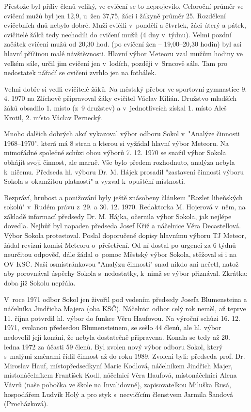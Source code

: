 \documentclass[a5paper, 12pt, twoside]{article}
\begin{document}
Přestože byl příliv členů veliký, ve cvičení se to neprojevilo.
Celoroční průměr ve cvičení mužů byl jen 12,9, u~žen 37,75, žáci i
žákyně průměr 25. Rozdělení cvičebních dnů nebylo dobré. Muži cvičili
v~pondělí a čtvrtek, žáci úterý a pátek, cvičitelé žáků tedy nechodili do
cvičení mužů (4 dny v~týdnu). Velmi pozdní začátek cvičení mužů od 20,30
hod. (po cvičení žen --⁠⁠⁠⁠⁠⁠ 19,00--⁠⁠⁠⁠⁠⁠20,30 hodin) byl asi hlavní příčinou malé
návštěvnosti. Hlavní výbor Meteoru vzal mužům hodiny ve velkém sále,
určil jim cvičení jen v~lodích, později v~Srncově sále. Tam pro
nedostatek nářadí se cvičení zvrhlo jen na fotbálek.

Velmi dobře si vedli cvičitelé žáků. Na městský přebor ve sportovní
gymnastice 9. 4. 1970 na Zlíchově připravoval žáky cvičitel Václav
Kilián. Družstvo mladších žáků obsadilo 1. místo (z~9 družstev) a
v~jednotlivcích získal 1. místo Aleš Krotil, 2. místo Václav Pernecký.

Mnoho dalších dobrých akcí vykazoval výbor odboru Sokol v~"Analýze
činnosti 1968--1970", která má 8 stran a kterou si vyžádal hlavní výbor
Meteoru. Na mimořádné společné schůzi obou výborů 7. 12. 1970 se snažil
výbor Sokola obhájit svoji činnost, ale marně. Vše bylo předem
rozhodnuto, analýza nebyla k~ničemu. Předseda hl. výboru Dr. M. Hájek
prosadil "zastavení činnosti výboru Sokola s~okamžitou platností" a
vyzval k~opuštění místnosti.

Bezpráví, hrubost a ponižování byly ještě znásobeny článkem "Rozlet
libeňských sokolů" v~Rudém právu z~29. a 30. 12. 1970. Redaktorka M.
Hojerová v~něm, na základě informací předsedy Dr. M. Hájka, očernila
výbor Sokola, jak nejlépe dovedla. Nejhůř byl napaden předseda Josef
Kříž a náčelnice Věra Decastellová. Výbor Sokola protestoval. Poslal
doporučené dopisy hlavnímu výboru TJ Meteor, žádal revizní komisi
Meteoru o~přešetření. Od ní dostal po urgenci za 6 týdnů neurčitou
odpověď, dále žádal o~pomoc Městský výbor Sokola, stěžoval si i na OV
KSČ. Naši osmistránkovou "Analýzu činnosti" snad nikdo ani nečetl,
natož aby porovnával úspěchy Sokola s~nedostatky, k~nimž se výbor
přiznával. Zkrátka: doba již Sokolu nepřála.

V~roce 1971 odbor Sokol jen živořil pod vedením předsedy Josefa
Blumensteina a náčelníka Jindřicha Majera (oba KSČ). Náčelnici odbor
celý rok neměl, až teprve 11. října potvrdil hl. výbor do funkce Věru
Haufovou. Na výroční schůzi 16. 12. 1971, svolanou předsedou
Blumensteinem, se sešlo 44 členů, ale hl. výbor nedovolil její konání,
že nebyla dostatečně připravena. Konala se tedy až 20. ledna 1972 za
účasti 59 členů. Byl zvolen nový výbor odboru Sokol, který s~malými
změnami řídil činnost až do roku 1989. Zvoleni byli: předseda prof. Dr.
Miroslav Hauf, místopředsedkyní Marie Kodlová, náčelníkem Jindřich
Majer, místonáčelníkem František Kodl, náčelnicí Věra Haufová,
místonáčelnicí Alena Vávrů (naše pobočka ve škole na Invalidovně),
zapisovatelkou Miluška Rusá, hospodářem Ludvík Holý a pro styk
s~necvičícím členstvem Jarmila Šandová (Procházková).
\end{document}
